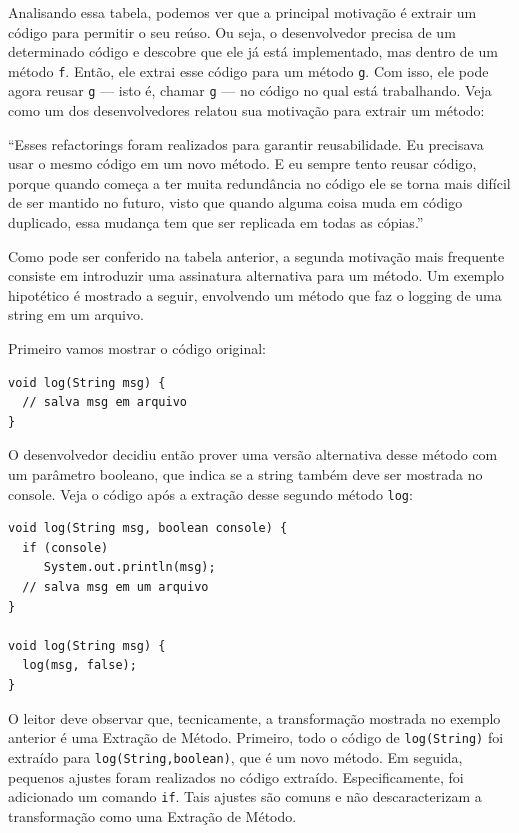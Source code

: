 \documentclass[
  11pt,
  twoside]{book}
\newcommand{\passthrough}[1]{#1}
\renewenvironment{quote}{\centering \vspace{1.5ex} \begin{tcolorbox}[colback=backcolor, width=4.9in]}{\end{tcolorbox}}
\begin{document}
Analisando essa tabela, podemos ver que a principal motivação é extrair
um código para permitir o seu reúso. Ou seja, o desenvolvedor precisa de
um determinado código e descobre que ele já está implementado, mas
dentro de um método \passthrough{\lstinline!f!}. Então, ele extrai esse
código para um método \passthrough{\lstinline!g!}. Com isso, ele pode
agora reusar \passthrough{\lstinline!g!} --- isto é, chamar
\passthrough{\lstinline!g!} --- no código no qual está trabalhando. Veja
como um dos desenvolvedores relatou sua motivação para extrair um
método:

\begin{quote}
``Esses refactorings foram realizados para garantir reusabilidade. Eu
precisava usar o mesmo código em um novo método. E eu sempre tento
reusar código, porque quando começa a ter muita redundância no código
ele se torna mais difícil de ser mantido no futuro, visto que quando
alguma coisa muda em código duplicado, essa mudança tem que ser
replicada em todas as cópias.''
\end{quote}

Como pode ser conferido na tabela anterior, a segunda motivação mais
frequente consiste em introduzir uma assinatura alternativa para um
método. Um exemplo hipotético é mostrado a seguir, envolvendo um método
que faz o logging de uma string em um arquivo.

Primeiro vamos mostrar o código original:

\begin{lstlisting}
void log(String msg) {
  // salva msg em arquivo
}
\end{lstlisting}

O desenvolvedor decidiu então prover uma versão alternativa desse método
com um parâmetro booleano, que indica se a string também deve ser
mostrada no console. Veja o código após a extração desse segundo método
\passthrough{\lstinline!log!}:

\begin{lstlisting}
void log(String msg, boolean console) {
  if (console)
     System.out.println(msg);
  // salva msg em um arquivo
}

void log(String msg) {
  log(msg, false);
}
\end{lstlisting}

O leitor deve observar que, tecnicamente, a transformação mostrada no
exemplo anterior é uma Extração de Método. Primeiro, todo o código de
\passthrough{\lstinline!log(String)!} foi extraído para
\passthrough{\lstinline!log(String,boolean)!}, que é um novo método. Em
seguida, pequenos ajustes foram realizados no código extraído.
Especificamente, foi adicionado um comando \passthrough{\lstinline!if!}.
Tais ajustes são comuns e não descaracterizam a transformação como uma
Extração de Método.
\end{document}
